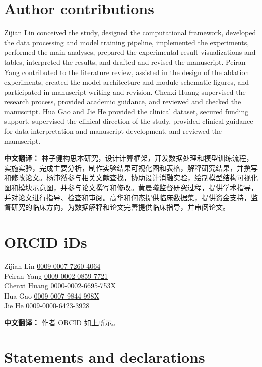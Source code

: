 \documentclass[Afour,sagev,times]{sagej}
\begin{document}
\section*{Author contributions}
Zijian Lin conceived the study, designed the computational framework, developed the data processing and model training pipeline, implemented the experiments, performed the main analyses, prepared the experimental result visualizations and tables, interpreted the results, and drafted and revised the manuscript. Peiran Yang contributed to the literature review, assisted in the design of the ablation experiments, created the model architecture and module schematic figures, and participated in manuscript writing and revision. Chenxi Huang supervised the research process, provided academic guidance, and reviewed and checked the manuscript. Hua Gao and Jie He provided the clinical dataset, secured funding support, supervised the clinical direction of the study, provided clinical guidance for data interpretation and manuscript development, and reviewed the manuscript.

\textbf{中文翻译：} 林子健构思本研究，设计计算框架，开发数据处理和模型训练流程，实施实验，完成主要分析，制作实验结果可视化图和表格，解释研究结果，并撰写和修改论文。杨沛然参与相关文献查找，协助设计消融实验，绘制模型结构可视化图和模块示意图，并参与论文撰写和修改。黄晨曦监督研究过程，提供学术指导，并对论文进行指导、检查和审阅。高华和何杰提供临床数据集，提供资金支持，监督研究的临床方向，为数据解释和论文完善提供临床指导，并审阅论文。

\section*{ORCID iDs}
Zijian Lin \href{https://orcid.org/0009-0007-7260-4064}{0009-0007-7260-4064}\\
Peiran Yang \href{https://orcid.org/0009-0002-0859-7721}{0009-0002-0859-7721}\\
Chenxi Huang \href{https://orcid.org/0000-0002-6695-753X}{0000-0002-6695-753X}\\
Hua Gao \href{https://orcid.org/0009-0007-9844-998X}{0009-0007-9844-998X}\\
Jie He \href{https://orcid.org/0009-0000-6423-3928}{0009-0000-6423-3928}

\textbf{中文翻译：} 作者 ORCID 如上所示。

\section*{Statements and declarations}
\end{document}
